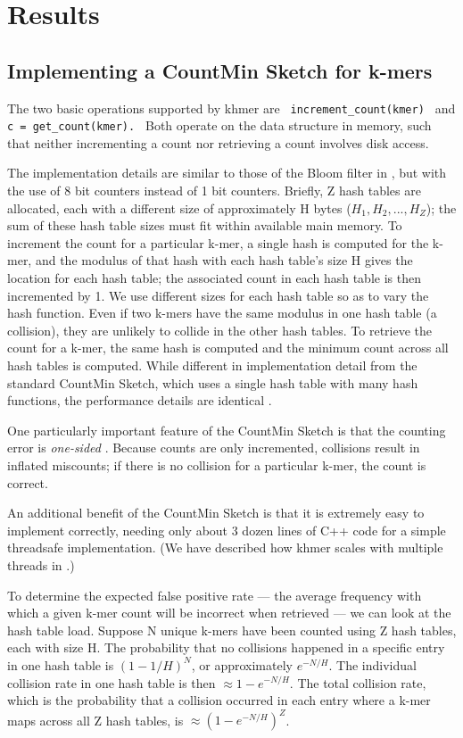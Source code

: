 \documentclass[10pt]{article}
\begin{document}
\section*{Results}

\subsection*{Implementing a CountMin Sketch for k-mers}

The two basic operations supported by khmer are {\tt
  increment\_count(kmer) } and {\tt c = get\_count(kmer). } Both
operate on the data structure in memory, such that neither
incrementing a count nor retrieving a count involves disk access.

The implementation details are similar to those of the Bloom filter in
\cite{Pell2012}, but with the use of 8 bit counters instead of 1 bit
counters.  Briefly, Z hash tables are allocated, each with a different
size of approximately H bytes ($H_1, H_2, ..., H_Z$); the sum of these
hash table sizes must fit within available main memory.  To increment
the count for a particular k-mer, a single hash is computed for the
k-mer, and the modulus of that hash with each hash table's size H
gives the location for each hash table; the associated count in each
hash table is then incremented by 1.  We use different sizes for each
hash table so as to vary the hash function.  Even if two k-mers have
the same modulus in one hash table (a collision), they are unlikely to
collide in the other hash tables.  To retrieve the count for a k-mer,
the same hash is computed and the minimum count across all hash tables
is computed.  While different in implementation detail from the
standard CountMin Sketch, which uses a single hash table with many
hash functions, the performance details are identical \cite{Pell2012}.

One particularly important feature of the CountMin Sketch is that the
counting error is {\em one-sided} \cite{Cormode2005}.  Because counts
are only incremented, collisions result in inflated miscounts; if
there is no collision for a particular k-mer, the count is correct.

An additional benefit of the CountMin Sketch is that it is extremely
easy to implement correctly, needing only about 3 dozen lines of C++
code for a simple threadsafe implementation.  (We have
described how khmer scales with multiple threads in
\cite{McDonald2013}.)

To determine the expected false positive rate --- the average frequency with
which a given k-mer count will be incorrect when retrieved --- we can
look at the hash table load. Suppose N unique k-mers have been counted
using Z hash tables, each with size H.  The probability that no
collisions happened in a specific entry in one hash table is
$(1-1/H)^{N}$, or approximately $e^{-N/H}$. The individual collision
rate in one hash table is then $\approx 1-e^{-N/H}$. The total
collision rate, which is the probability that a collision occurred in
each entry where a k-mer maps across all Z hash tables, is $\approx
(1-e^{-N/H})^{Z}$.
\end{document}
